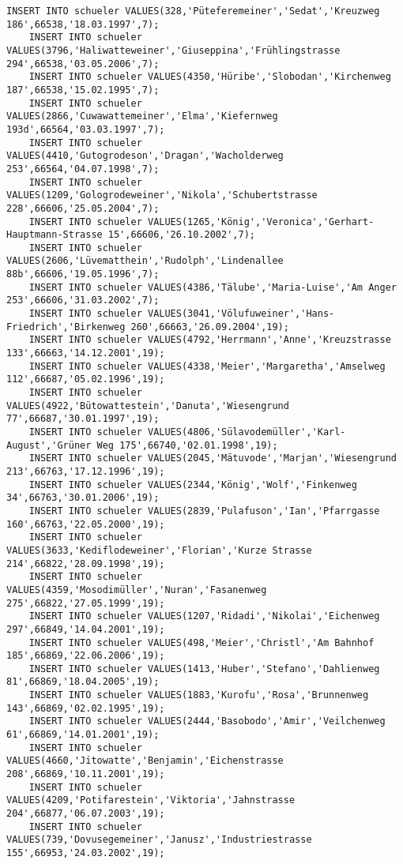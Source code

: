 \begin{lstlisting}[breaklines=True, numbers=none, basicstyle=\tiny, keepspaces=false]
	INSERT INTO schueler VALUES(328,'Püteferemeiner','Sedat','Kreuzweg 186',66538,'18.03.1997',7);
	INSERT INTO schueler VALUES(3796,'Haliwatteweiner','Giuseppina','Frühlingstrasse 294',66538,'03.05.2006',7);
	INSERT INTO schueler VALUES(4350,'Hüribe','Slobodan','Kirchenweg 187',66538,'15.02.1995',7);
	INSERT INTO schueler VALUES(2866,'Cuwawattemeiner','Elma','Kiefernweg 193d',66564,'03.03.1997',7);
	INSERT INTO schueler VALUES(4410,'Gutogrodeson','Dragan','Wacholderweg 253',66564,'04.07.1998',7);
	INSERT INTO schueler VALUES(1209,'Gologrodeweiner','Nikola','Schubertstrasse 228',66606,'25.05.2004',7);
	INSERT INTO schueler VALUES(1265,'König','Veronica','Gerhart-Hauptmann-Strasse 15',66606,'26.10.2002',7);
	INSERT INTO schueler VALUES(2606,'Lüvematthein','Rudolph','Lindenallee 88b',66606,'19.05.1996',7);
	INSERT INTO schueler VALUES(4386,'Tälube','Maria-Luise','Am Anger 253',66606,'31.03.2002',7);
	INSERT INTO schueler VALUES(3041,'Völufuweiner','Hans-Friedrich','Birkenweg 260',66663,'26.09.2004',19);
	INSERT INTO schueler VALUES(4792,'Herrmann','Anne','Kreuzstrasse 133',66663,'14.12.2001',19);
	INSERT INTO schueler VALUES(4338,'Meier','Margaretha','Amselweg 112',66687,'05.02.1996',19);
	INSERT INTO schueler VALUES(4922,'Bütowattestein','Danuta','Wiesengrund 77',66687,'30.01.1997',19);
	INSERT INTO schueler VALUES(4806,'Sülavodemüller','Karl-August','Grüner Weg 175',66740,'02.01.1998',19);
	INSERT INTO schueler VALUES(2045,'Mätuvode','Marjan','Wiesengrund 213',66763,'17.12.1996',19);
	INSERT INTO schueler VALUES(2344,'König','Wolf','Finkenweg 34',66763,'30.01.2006',19);
	INSERT INTO schueler VALUES(2839,'Pulafuson','Ian','Pfarrgasse 160',66763,'22.05.2000',19);
	INSERT INTO schueler VALUES(3633,'Kediflodeweiner','Florian','Kurze Strasse 214',66822,'28.09.1998',19);
	INSERT INTO schueler VALUES(4359,'Mosodimüller','Nuran','Fasanenweg 275',66822,'27.05.1999',19);
	INSERT INTO schueler VALUES(1207,'Ridadi','Nikolai','Eichenweg 297',66849,'14.04.2001',19);
	INSERT INTO schueler VALUES(498,'Meier','Christl','Am Bahnhof 185',66869,'22.06.2006',19);
	INSERT INTO schueler VALUES(1413,'Huber','Stefano','Dahlienweg 81',66869,'18.04.2005',19);
	INSERT INTO schueler VALUES(1883,'Kurofu','Rosa','Brunnenweg 143',66869,'02.02.1995',19);
	INSERT INTO schueler VALUES(2444,'Basobodo','Amir','Veilchenweg 61',66869,'14.01.2001',19);
	INSERT INTO schueler VALUES(4660,'Jitowatte','Benjamin','Eichenstrasse 208',66869,'10.11.2001',19);
	INSERT INTO schueler VALUES(4209,'Potifarestein','Viktoria','Jahnstrasse 204',66877,'06.07.2003',19);
	INSERT INTO schueler VALUES(739,'Dovusegemeiner','Janusz','Industriestrasse 155',66953,'24.03.2002',19);

\end{lstlisting}
